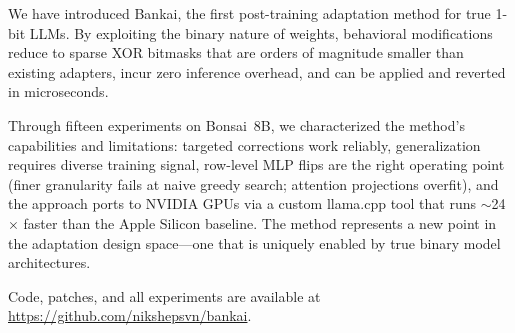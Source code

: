 \documentclass[11pt,a4paper]{article}
\begin{document}
We have introduced Bankai, the first post-training adaptation method for
true 1-bit LLMs. By exploiting the binary nature of weights, behavioral
modifications reduce to sparse XOR bitmasks that are orders of magnitude
smaller than existing adapters, incur zero inference overhead, and can be
applied and reverted in microseconds.

Through fifteen experiments on Bonsai~8B, we characterized the method's
capabilities and limitations: targeted corrections work reliably,
generalization requires diverse training signal, row-level MLP flips
are the right operating point (finer granularity fails at naive greedy
search; attention projections overfit), and the approach ports to
NVIDIA GPUs via a custom llama.cpp tool that runs $\sim$24$\times$ faster
than the Apple Silicon baseline. The method represents a new point in
the adaptation design space---one that is uniquely enabled by true
binary model architectures.

Code, patches, and all experiments are available at
\url{https://github.com/nikshepsvn/bankai}.
\end{document}
